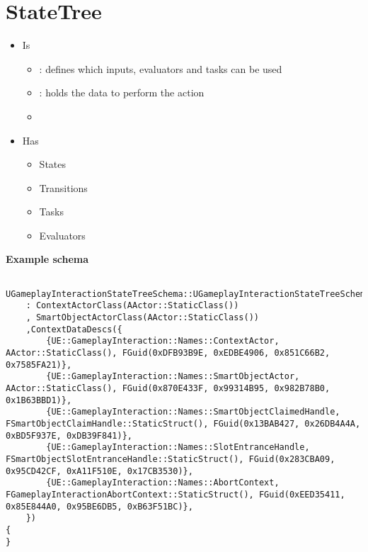     \section{StateTree}
        \begin{itemize}
            \item Is
            \begin{itemize}
                \item {}: defines which inputs, evaluators and tasks can be used
                \item {}: holds the data to perform the action
                \item 
            \end{itemize}
            \item Has
            \begin{itemize}
                \item States
                \item Transitions
                \item Tasks
                \item Evaluators
            \end{itemize}
        \end{itemize}

        \textbf{Example schema}
        \begin{lstlisting}
    UGameplayInteractionStateTreeSchema::UGameplayInteractionStateTreeSchema()
    : ContextActorClass(AActor::StaticClass())
    , SmartObjectActorClass(AActor::StaticClass())
    ,ContextDataDescs({
        {UE::GameplayInteraction::Names::ContextActor, AActor::StaticClass(), FGuid(0xDFB93B9E, 0xEDBE4906, 0x851C66B2, 0x7585FA21)},
        {UE::GameplayInteraction::Names::SmartObjectActor, AActor::StaticClass(), FGuid(0x870E433F, 0x99314B95, 0x982B78B0, 0x1B63BBD1)},
        {UE::GameplayInteraction::Names::SmartObjectClaimedHandle, FSmartObjectClaimHandle::StaticStruct(), FGuid(0x13BAB427, 0x26DB4A4A, 0xBD5F937E, 0xDB39F841)},
        {UE::GameplayInteraction::Names::SlotEntranceHandle, FSmartObjectSlotEntranceHandle::StaticStruct(), FGuid(0x283CBA09, 0x95CD42CF, 0xA11F510E, 0x17CB3530)},
        {UE::GameplayInteraction::Names::AbortContext, FGameplayInteractionAbortContext::StaticStruct(), FGuid(0xEED35411, 0x85E844A0, 0x95BE6DB5, 0xB63F51BC)},
    })
{
}
        \end{lstlisting}


